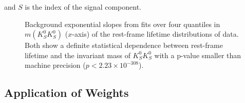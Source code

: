 and $S$ is the index of the signal component.


\begin{figure}
  \begin{center}
    
  \end{center}
  \caption{Background exponential slopes from fits over four quantiles in $m(K_S^0K_S^0)$ ($x$-axis) of the rest-frame lifetime distributions of data. Both show a definite statistical dependence between rest-frame lifetime and the invariant mass of $K_S^0K_S^0$ with a p-value smaller than machine precision ($p < 2.23 \times 10^{-308}$).}\label{fig:factorization}
\end{figure}

\subsection{Application of Weights}\label{sec:application-of-weights}

